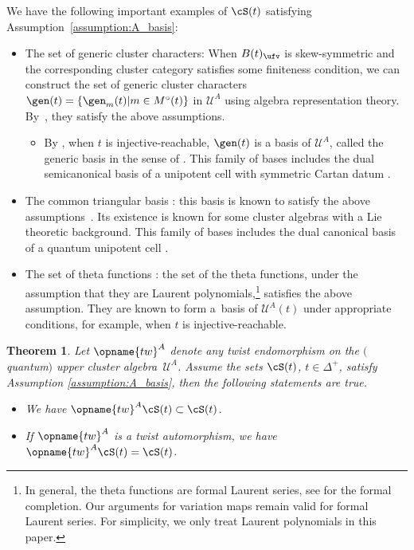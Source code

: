 \documentclass[pdftex]{sigma}
\renewcommand{\tw}{\opname{tw}}
\newcommand{\Mc}{M^\circ}
\newcommand{\upClAlg}{\mathcal{U}^A}
\renewcommand{\tw}{\opname{tw}}
\numberwithin{equation}{section}
\newtheorem{Theorem}{Theorem}[section]
\begin{document}
We have the following important examples of $\cS(t)$ satisfying
Assumption~\ref{assumption:A_basis}:
\begin{itemize}\itemsep=0pt
\item The set of generic cluster characters: When $B(t)_{\ufv}$ is skew-symmetric
and the corresponding cluster category satisfies some finiteness condition,
we can construct the set of generic cluster characters $\gen(t)=\{\gen_{m}(t)|m\in\Mc(t)\}$
in $\upClAlg$ using algebra representation theory. By~\cite{plamondon2013generic},
they satisfy the above assumptions.
\begin{itemize}\itemsep=0pt
\item By \cite{qin2019bases}, when $t$ is injective-reachable, $\gen(t)$
is a basis of $\upClAlg$, called the generic basis in the sense of
\cite{dupont2011generic}. This family of bases includes the dual
semicanonical basis \cite{lusztig2000semicanonical} of a unipotent
cell with symmetric Cartan datum \cite{GeissLeclercSchroeer10b}.
\end{itemize}
\item The common triangular basis \cite{qin2017triangular}: this basis
is known to satisfy the above assumptions~\cite{qin2017triangular}.
Its existence is known for some cluster algebras with a Lie theoretic
background. This family of bases includes the dual canonical basis
of a quantum unipotent cell \cite{kashiwara2019laurent,qin2017triangular,qin2020dual}.
\item The set of theta functions \cite{gross2018canonical}: the set of
the theta functions, under the assumption that they are Laurent polynomials,\footnote{In general, the theta functions are formal Laurent series, see \cite{qin2019bases}
for the formal completion. Our arguments for variation maps remain
valid for formal Laurent series. For simplicity, we only treat Laurent
polynomials in this paper.} satisfies the above assumption. They
are known to form a~basis of $\upClAlg(t)$ under appropriate conditions,
for example, when $t$ is injective-reachable.
\end{itemize}
\begin{Theorem}\label{thm:twist_A_basis}
Let $\tw^{A}$ denote any twist endomorphism on the $($quantum$)$ upper cluster algebra~$\upClAlg$. Assume
the sets $\cS(t)$, $t\in \Delta^+$, satisfy Assumption {\rm \ref{assumption:A_basis}}, then the following statements are true.
\begin{itemize}\itemsep=0pt
\item[$(1)$] We have $\tw^{A}\cS(t)\subset\cS(t)$.
\item[$(2)$] If $\tw^{A}$ is a twist automorphism, we have $\tw^{A}\cS(t)=\cS(t)$.
\end{itemize}
\end{Theorem}
\end{document}
